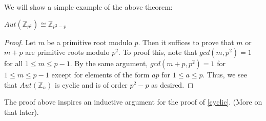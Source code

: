 \documentclass[main.tex]{subfiles}
\begin{document}
We will show a simple example of the above theorem:

\begin{proposition}
$Aut(\mathbb{Z}_{p^2}) \cong \mathbb{Z}_{p^2 - p}$
\end{proposition}

\begin{proof}
Let $m$ be a primitive root modulo $p$. Then it suffices to prove that $m$ or $m+p$ are primitive roots modulo $p^2$. To proof this, note that $gcd(m,p^2) = 1$ for all $1 \leq m \leq p-1$. By the same argument, $gcd(m+p,p^2) = 1$ for $1 \leq m \leq p-1$ except for elements of the form $ap$ for $1 \leq a \leq p$. Thus, we see that $Aut(\mathbb{Z}_n)$ is cyclic and is of order $p^2 - p$ as desired.
\end{proof}

The proof above inspires an inductive argument for the proof of \ref{cyclic}. (More on that later).
\end{document}
